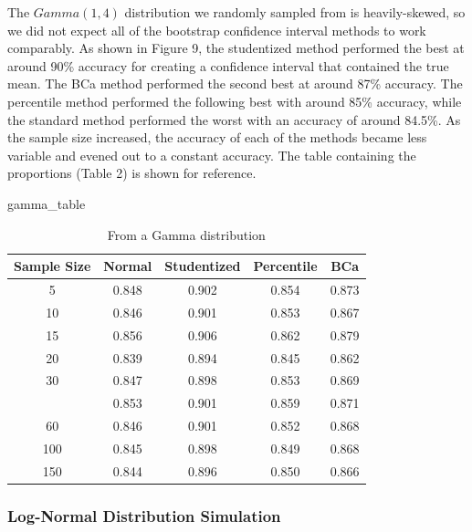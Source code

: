 \documentclass[12pt]{article}
\newenvironment{Shaded}{\begin{snugshade}}{\end{snugshade}}
\newcommand{\NormalTok}[1]{#1}
\begin{document}
The \(Gamma(1,4)\) distribution we randomly sampled from is
heavily-skewed, so we did not expect all of the bootstrap confidence
interval methods to work comparably. As shown in Figure 9, the
studentized method performed the best at around 90\% accuracy for
creating a confidence interval that contained the true mean. The BCa
method performed the second best at around 87\% accuracy. The percentile
method performed the following best with around 85\% accuracy, while the
standard method performed the worst with an accuracy of around 84.5\%.
As the sample size increased, the accuracy of each of the methods became
less variable and evened out to a constant accuracy. The table
containing the proportions (Table 2) is shown for reference.

\begin{Shaded}
\begin{Highlighting}[]
\NormalTok{gamma\_table}
\end{Highlighting}
\end{Shaded}

\begin{table}

\caption{\label{tab:create graphs}From a Gamma distribution}
\centering
\begin{tabular}[t]{ccccc}
\toprule
Sample Size & Normal & Studentized & Percentile & BCa\\
\midrule
5 & 0.848 & 0.902 & 0.854 & 0.873\\
10 & 0.846 & 0.901 & 0.853 & 0.867\\
15 & 0.856 & 0.906 & 0.862 & 0.879\\
20 & 0.839 & 0.894 & 0.845 & 0.862\\
30 & 0.847 & 0.898 & 0.853 & 0.869\\
\addlinespace
40 & 0.853 & 0.901 & 0.859 & 0.871\\
60 & 0.846 & 0.901 & 0.852 & 0.868\\
100 & 0.845 & 0.898 & 0.849 & 0.868\\
150 & 0.844 & 0.896 & 0.850 & 0.866\\
\bottomrule
\end{tabular}
\end{table}

\hypertarget{log-normal-distribution-simulation}{%
\subsubsection{Log-Normal Distribution
Simulation}\label{log-normal-distribution-simulation}}
\end{document}
